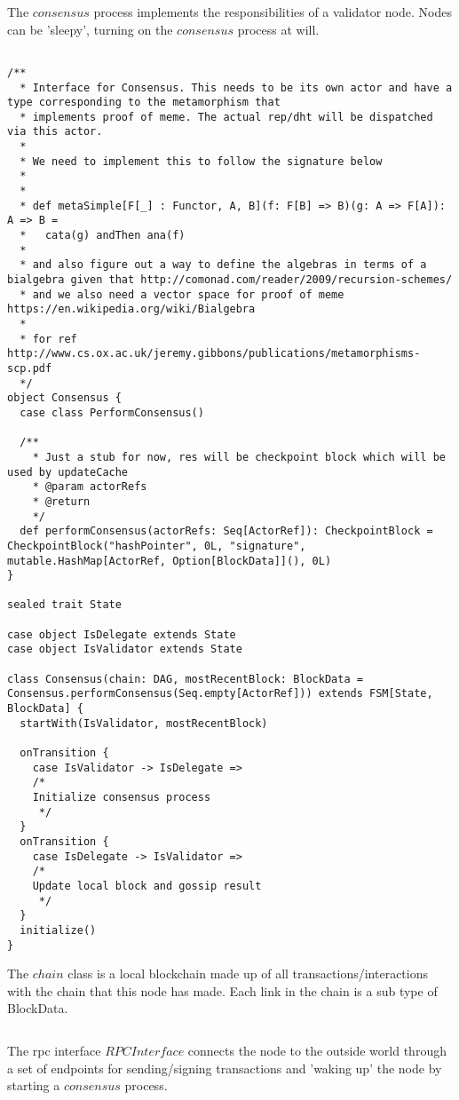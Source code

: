 \documentclass{article}
\begin{document}
The $consensus$ process implements the responsibilities of a validator node. Nodes can be 'sleepy', turning on the $consensus$ process at will.

\begin{lstlisting}

/**
  * Interface for Consensus. This needs to be its own actor and have a type corresponding to the metamorphism that
  * implements proof of meme. The actual rep/dht will be dispatched via this actor.
  *
  * We need to implement this to follow the signature below
  *
  *
  * def metaSimple[F[_] : Functor, A, B](f: F[B] => B)(g: A => F[A]): A => B =
  *   cata(g) andThen ana(f)
  *
  * and also figure out a way to define the algebras in terms of a bialgebra given that http://comonad.com/reader/2009/recursion-schemes/
  * and we also need a vector space for proof of meme https://en.wikipedia.org/wiki/Bialgebra
  *
  * for ref http://www.cs.ox.ac.uk/jeremy.gibbons/publications/metamorphisms-scp.pdf
  */
object Consensus {
  case class PerformConsensus()

  /**
    * Just a stub for now, res will be checkpoint block which will be used by updateCache
    * @param actorRefs
    * @return
    */
  def performConsensus(actorRefs: Seq[ActorRef]): CheckpointBlock = CheckpointBlock("hashPointer", 0L, "signature", mutable.HashMap[ActorRef, Option[BlockData]](), 0L)
}

sealed trait State

case object IsDelegate extends State
case object IsValidator extends State

class Consensus(chain: DAG, mostRecentBlock: BlockData = Consensus.performConsensus(Seq.empty[ActorRef])) extends FSM[State, BlockData] {
  startWith(IsValidator, mostRecentBlock)

  onTransition {
    case IsValidator -> IsDelegate =>
    /*
    Initialize consensus process
     */
  }
  onTransition {
    case IsDelegate -> IsValidator =>
    /*
    Update local block and gossip result
     */
  }
  initialize()
}

\end{lstlisting}

The $chain$ class is a local blockchain made up of all transactions/interactions with the chain that this node has made. Each link in the chain is a sub type of BlockData.

\begin{lstlisting}
\end{lstlisting}

The rpc interface $RPCInterface$ connects the node to the outside world through a set of endpoints for sending/signing transactions and 'waking up' the node by starting a $consensus$ process.
\end{document}
